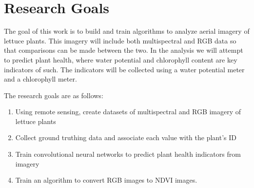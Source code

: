 \chapter{Research Goals}

The goal of this work is to build and train algorithms to analyze aerial imagery of lettuce plants. This imagery will include both multispectral and RGB data so that comparisons can be made between the two. In the analysis we will attempt to predict plant health, where water potential and chlorophyll content are key indicators of such. The indicators will be collected using a water potential meter and a chlorophyll meter. 

The research goals are as follows:
\begin{enumerate}
    \item Using remote sensing, create datasets of multispectral and RGB imagery of lettuce plants
    \item Collect ground truthing data and associate each value with the plant's ID
    \item Train convolutional neural networks to predict plant health indicators from imagery
    \item Train an algorithm to convert RGB images to NDVI images.
\end{enumerate}